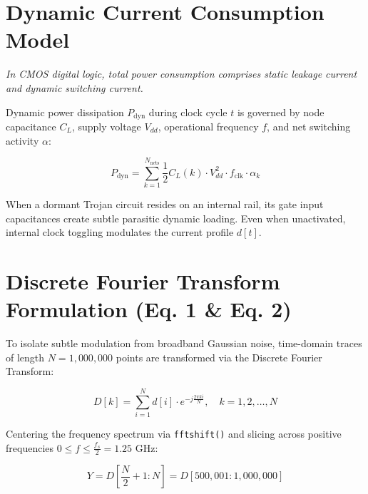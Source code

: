 \documentclass[11pt,a4paper,oneside]{book}
\begin{document}
\section{Dynamic Current Consumption Model}

{\itshape
In CMOS digital logic, total power consumption comprises static leakage current and dynamic switching current.
}

Dynamic power dissipation $P_{\text{dyn}}$ during clock cycle $t$ is governed by node capacitance $C_L$, supply voltage $V_{dd}$, operational frequency $f$, and net switching activity $\alpha$:

\begin{equation}
P_{\text{dyn}} = \sum_{k=1}^{N_{\text{nets}}} \frac{1}{2} C_L(k) \cdot V_{dd}^2 \cdot f_{\text{clk}} \cdot \alpha_k
\end{equation}

When a dormant Trojan circuit resides on an internal rail, its gate input capacitances create subtle parasitic dynamic loading. Even when unactivated, internal clock toggling modulates the current profile $d[t]$.

\section{Discrete Fourier Transform Formulation (Eq. 1 \& Eq. 2)}

To isolate subtle modulation from broadband Gaussian noise, time-domain traces of length $N = 1,000,000$ points are transformed via the Discrete Fourier Transform:

\begin{equation}
D[k] = \sum_{i=1}^{N} d[i] \cdot e^{-j \frac{2\pi k i}{N}}, \quad k = 1, 2, \dots, N
\end{equation}

Centering the frequency spectrum via \texttt{fftshift()} and slicing across positive frequencies $0 \le f \le \frac{f_s}{2} = 1.25\text{ GHz}$:

\begin{equation}
Y = D\left[\frac{N}{2} + 1 : N\right] = D[500,001 : 1,000,000]
\end{equation}
\end{document}
